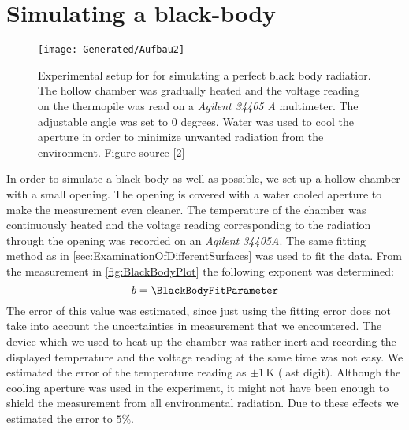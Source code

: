 \documentclass[a4paper,10pt,twocolumn]{article}
\begin{document}
    \section{Simulating a black-body}\label{sec:BlackBodyRadiation}
    \begin{figure}
        \begin{center}
            \texttt{[image: Generated/Aufbau2]}
            \caption{Experimental setup for for simulating a perfect black body radiatior. The hollow chamber was gradually heated
            and the voltage reading on the thermopile was read on a \textit{Agilent 34405 A} multimeter. The adjustable angle was set to 0 degrees.
            Water was used to cool the aperture in order to minimize unwanted radiation from the environment.
            Figure source [2]}
            \label{fig:Aufbau2}
        \end{center}
    \end{figure}
    In order to simulate a black body as well as possible, we set up a hollow chamber with a small opening.
    The opening is covered with a water cooled aperture to make the measurement even cleaner.
    The temperature of the chamber was continuously heated and the voltage reading corresponding to the radiation through the opening was recorded on an \textit{Agilent 34405A}.
    \newline
    The same fitting method as in \autoref{sec:ExaminationOfDifferentSurfaces} was used to fit the data.
    From the measurement in \autoref{fig:BlackBodyPlot} the following exponent was determined:
    \begin{equation}
        b = \BlackBodyFitParameter
    \end{equation}
    The error of this value was estimated, since just using the fitting error does not take into account the uncertainties in measurement that we encountered.
    The device which we used to heat up the chamber was rather inert and recording the displayed temperature and the voltage reading at the same time was not easy.
    We estimated the error of the temperature reading as $\pm 1\,$K (last digit).
    Although the cooling aperture was used in the experiment, it might not have been enough to shield the measurement from all environmental radiation.
    Due to these effects we estimated the error to $5\%$\).
    
\end{document}
